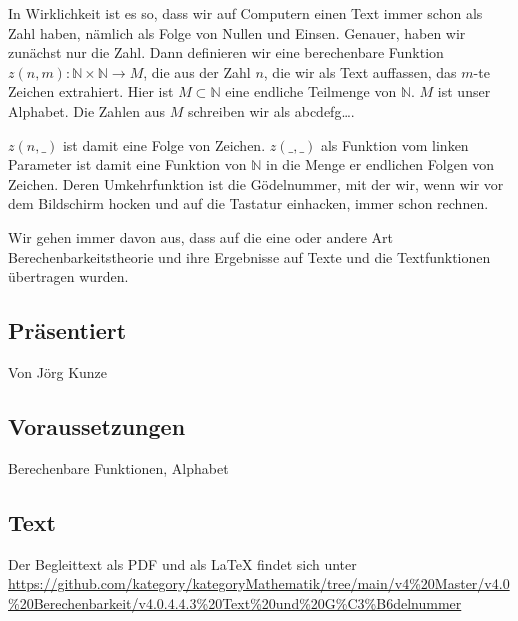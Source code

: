 \documentclass[a4paper]{amsart}
\theoremstyle{definition}
\newcommand{\N}{\ensuremath{\mathbb{ N }}}
\begin{document}
In Wirklichkeit ist es so, dass wir auf Computern einen Text immer schon als Zahl haben, nämlich als Folge von Nullen und Einsen. Genauer, haben wir zunächst nur die Zahl. Dann definieren wir eine berechenbare Funktion $z(n,m) \colon \N \times \N \to M$, die aus der Zahl $n$, die wir als Text auffassen, das $m$-te Zeichen extrahiert. Hier ist $M \subset \N$ eine endliche Teilmenge von $\N$. $M$ ist unser Alphabet. Die Zahlen aus $M$ schreiben wir als abcdefg\dots.

$z(n, \_)$ ist damit eine Folge von Zeichen. $z( \_, \_)$ als Funktion vom linken Parameter ist damit eine Funktion von $\N$ in die Menge er endlichen Folgen von Zeichen. Deren Umkehrfunktion ist die Gödelnummer, mit der wir, wenn wir vor dem Bildschirm hocken und auf die Tastatur einhacken, immer schon rechnen.

Wir gehen immer davon aus, dass auf die eine oder andere Art Berechenbarkeitstheorie und ihre Ergebnisse auf Texte und die Textfunktionen übertragen wurden.

\subsection*{Präsentiert}
Von Jörg Kunze

\subsection*{Voraussetzungen}
Berechenbare Funktionen, Alphabet

\subsection*{Text}
Der Begleittext als PDF und als LaTeX findet sich unter
{\tiny
   \url{https://github.com/kategory/kategoryMathematik/tree/main/v4%20Master/v4.0%20Berechenbarkeit/v4.0.4.4.3%20Text%20und%20G%C3%B6delnummer}
}
\end{document}
